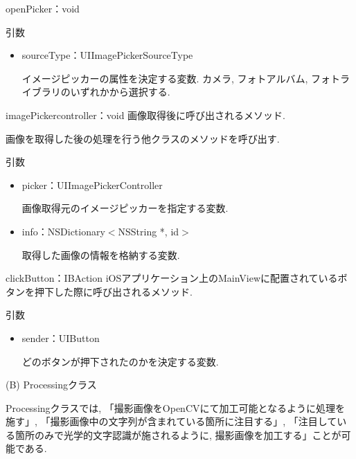 \begin{description}
\begin{itemize}
\begin{itembox}[l]{openPicker：void}
\begin{itembox}[l]{引数}
\begin{itemize}
\item sourceType：UIImagePickerSourceType

イメージピッカーの属性を決定する変数.
カメラ, フォトアルバム, フォトライブラリのいずれかから選択する.
\end{itemize}
\end{itembox}
\end{itembox}

\begin{itembox}[l]{imagePickercontroller：void}
画像取得後に呼び出されるメソッド.

画像を取得した後の処理を行う他クラスのメソッドを呼び出す.

\begin{itembox}[l]{引数}
\begin{itemize}
\item picker：UIImagePickerController

画像取得元のイメージピッカーを指定する変数.

\item info：NSDictionary$<$NSString *, id$>$

取得した画像の情報を格納する変数.
\end{itemize}
\end{itembox}
\end{itembox}

\begin{itembox}[l]{clickButton：IBAction}
iOSアプリケーション上のMainViewに配置されているボタンを押下した際に呼び出されるメソッド.

\begin{itembox}[l]{引数}
\begin{itemize}
\item sender：UIButton

どのボタンが押下されたのかを決定する変数.
\end{itemize}
\end{itembox}
\end{itembox}

\end{itemize}


\item (B) Processingクラス

Processingクラスでは, 「撮影画像をOpenCVにて加工可能となるように処理を施す」, 「撮影画像中の文字列が含まれている箇所に注目する」, 「注目している箇所のみで光学的文字認識が施されるように, 撮影画像を加工する」ことが可能である.


\end{description}
